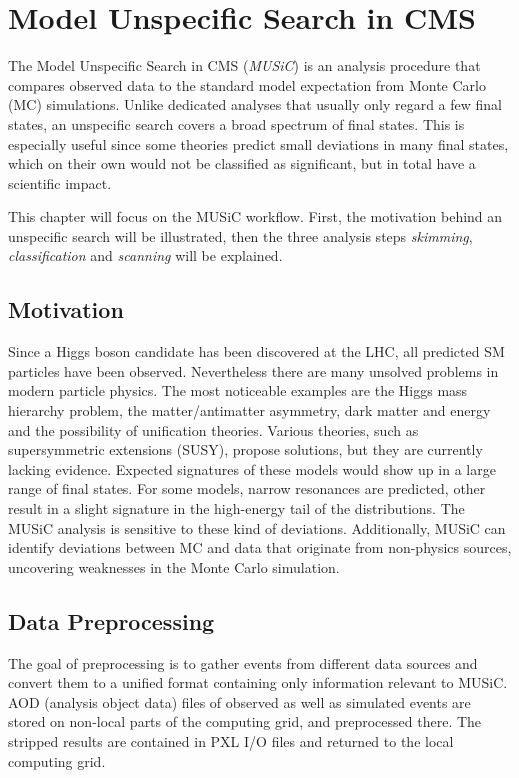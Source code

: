 
\chapter{Model Unspecific Search in CMS}

The Model Unspecific Search in CMS (\emph{MUSiC})\cite{Pieta2012MUSiC,Papacz2014Model,Duchardt2015MUSiC} is an analysis procedure that compares observed data to the standard model expectation from Monte Carlo (MC) simulations. Unlike dedicated analyses that usually only regard a few final states, an unspecific search covers a broad spectrum of final states.
This is especially useful since some theories predict small deviations in many final states, which on their own would not be classified as significant, but in total have a scientific impact.

This chapter will focus on the MUSiC workflow. First, the motivation behind an unspecific search will be illustrated, then the three analysis steps \emph{skimming}, \emph{classification} and \emph{scanning} will be explained.

\section{Motivation}
Since a Higgs boson candidate has been discovered at the LHC\cite{Ao2015Combined}, all predicted SM particles have been observed.
Nevertheless there are many unsolved problems in modern particle physics. The most noticeable examples are the Higgs mass hierarchy problem, the matter/antimatter asymmetry, dark matter and energy and the possibility of unification theories. Various theories, such as supersymmetric extensions (SUSY), propose solutions, but they are currently lacking evidence.
Expected signatures of these models would show up in a large range of final states. For some models, narrow resonances are predicted, other result in a slight signature in the high-energy tail of the distributions.
The MUSiC analysis is sensitive to these kind of deviations.
Additionally, MUSiC can identify deviations between MC and data that originate from non-physics sources, uncovering weaknesses in the Monte Carlo simulation.

\section{Data Preprocessing}
The goal of preprocessing is to gather events from different data sources and convert them to a unified format containing only information relevant to MUSiC. AOD (analysis object data) files of observed as well as simulated events are stored on non-local parts of the computing grid, and preprocessed there. The stripped results are contained in PXL I/O files\cite{BBE+2012Development} and returned to the local computing grid.


